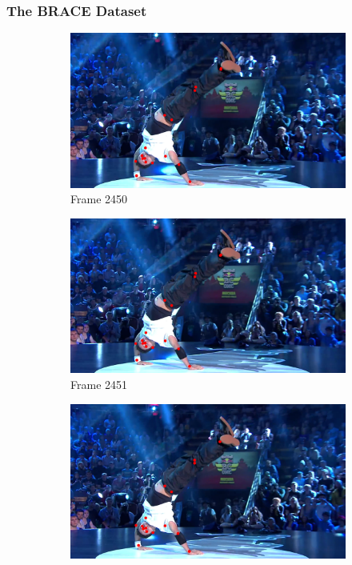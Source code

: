 \documentclass[./main.tex]{subfiles}
\begin{document}
\subsubsection{The BRACE Dataset}
\label{sec:BRACE}
\begin{figure}[htbp]
    \centering
    \begin{subfigure}{0.45\textwidth}
        \centering
        \includegraphics[width=\textwidth]{entities/BRACE_2450.png}
        \caption{Frame 2450}
    \end{subfigure}
    \begin{subfigure}{0.45\textwidth}
        \centering
        \includegraphics[width=\textwidth]{entities/BRACE_2451.png}
        \caption{Frame 2451}
    \end{subfigure}
    \begin{subfigure}{0.45\textwidth}
        \centering
        \includegraphics[width=\textwidth]{entities/BRACE_2452.png}

\end{subfigure}
\end{figure}
\end{document}
